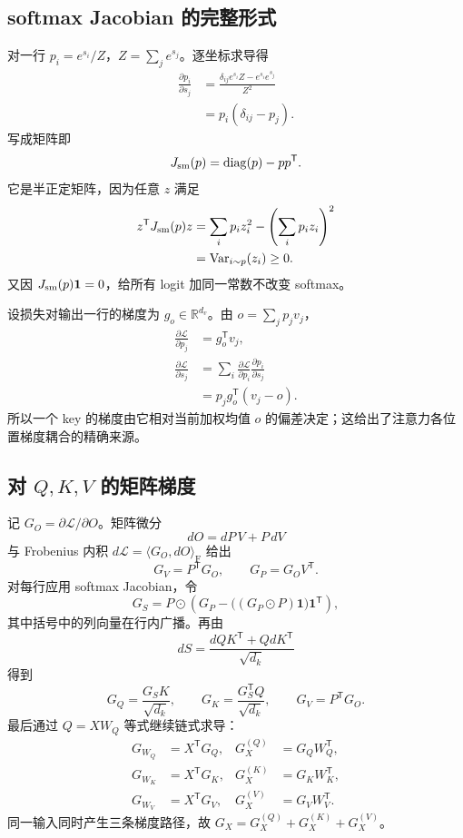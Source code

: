 \documentclass[11pt]{article}
\numberwithin{equation}{section}
\newcommand{\R}{\mathbb{R}}
\newcommand{\1}{\mathbf{1}}
\newcommand{\T}{\mathsf{T}}
\newcommand{\F}{\mathrm{F}}
\newcommand{\cL}{\mathcal{L}}
\newcommand{\diag}{\operatorname{diag}}
\newcommand{\Var}{\operatorname{Var}}
\begin{document}
\subsection{softmax Jacobian 的完整形式}

对一行 $p_i=e^{s_i}/Z$，$Z=\sum_j e^{s_j}$。逐坐标求导得
\begin{align}
 \frac{\partial p_i}{\partial s_j}
 &=\frac{\delta_{ij}e^{s_i}Z-e^{s_i}e^{s_j}}{Z^2}\\
 &=p_i(\delta_{ij}-p_j).
\end{align}
写成矩阵即
\begin{equation}
 J_{\rm sm}(p)=\diag(p)-pp^\T.
\end{equation}
它是半正定矩阵，因为任意 $z$ 满足
\begin{align}
 z^\T J_{\rm sm}(p)z
 &=\sum_i p_i z_i^2-\left(\sum_i p_i z_i\right)^2\\
 &=\Var_{i\sim p}(z_i)\ge0.
\end{align}
又因 $J_{\rm sm}(p)\1=0$，给所有 logit 加同一常数不改变 softmax。

设损失对输出一行的梯度为 $g_o\in\R^{d_v}$。由 $o=\sum_jp_jv_j$，
\begin{align}
 \frac{\partial\cL}{\partial p_j}&=g_o^\T v_j,\\
 \frac{\partial\cL}{\partial s_j}
 &=\sum_i\frac{\partial\cL}{\partial p_i}
       \frac{\partial p_i}{\partial s_j}\\
 &=p_j g_o^\T(v_j-o).
\end{align}
所以一个 key 的梯度由它相对当前加权均值 $o$ 的偏差决定；这给出了注意力各位置梯度耦合的精确来源。

\subsection{对 $Q,K,V$ 的矩阵梯度}

记 $G_O=\partial\cL/\partial O$。矩阵微分
\begin{equation}
 dO=dP\,V+P\,dV
\end{equation}
与 Frobenius 内积 $d\cL=\langle G_O,dO\rangle_\F$ 给出
\begin{equation}
 G_V=P^\T G_O,
 \qquad
 G_P=G_O V^\T.
\end{equation}
对每行应用 softmax Jacobian，令
\begin{equation}
 G_S=P\odot\left(G_P-\bigl((G_P\odot P)\1\bigr)\1^\T\right),
\end{equation}
其中括号中的列向量在行内广播。再由
\begin{equation}
 dS=\frac{dQK^\T+QdK^\T}{\sqrt{d_k}}
\end{equation}
得到
\begin{equation}
 \boxed{
 G_Q=\frac{G_SK}{\sqrt{d_k}},\qquad
 G_K=\frac{G_S^{\T}Q}{\sqrt{d_k}},\qquad
 G_V=P^{\T}G_O.}
\end{equation}
最后通过 $Q=XW_Q$ 等式继续链式求导：
\begin{align}
 G_{W_Q}&=X^{\T}G_Q,&G_X^{(Q)}&=G_QW_Q^\T,\\
 G_{W_K}&=X^{\T}G_K,&G_X^{(K)}&=G_KW_K^\T,\\
 G_{W_V}&=X^{\T}G_V,&G_X^{(V)}&=G_VW_V^\T.
\end{align}
同一输入同时产生三条梯度路径，故
$G_X=G_X^{(Q)}+G_X^{(K)}+G_X^{(V)}$。
\end{document}
